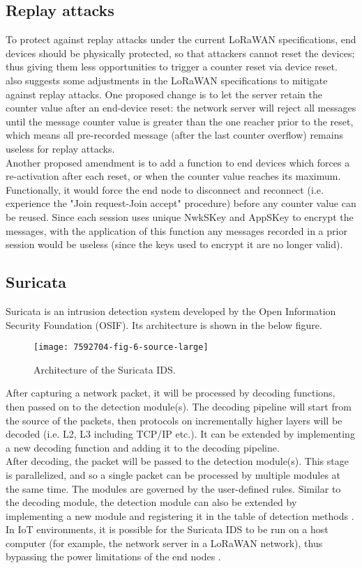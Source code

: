 \documentclass{article}
\begin{document}
\subsection{Replay attacks}
To protect against replay attacks under the current LoRaWAN specifications, end devices should be physically protected, so that attackers cannot reset the devices; thus giving them less opportunities to trigger a counter reset via device reset.\\
\cite{ref2} also suggests some adjustments in the LoRaWAN specifications to mitigate against replay attacks. One proposed change is to let the server retain the counter value after an end-device reset: the network server will reject all messages until the message counter value is greater than the one reacher prior to the reset, which means all pre-recorded message (after the last counter overflow) remains useless for replay attacks.\\
Another proposed amendment is to add a function to end devices which forces a re-activation after each reset, or when the counter value reaches its maximum. Functionally, it would force the end node to disconnect and reconnect (i.e. experience the "Join request-Join accept" procedure) before any counter value can be reused. Since each session uses unique NwkSKey and AppSKey to encrypt the messages, with the application of this function any messages recorded in a prior session would be useless (since the keys used to encrypt it are no longer valid).
\subsection{Suricata}
Suricata is an intrusion detection system developed by the Open Information Security Foundation (OSIF). Its architecture is shown in the below figure.
\begin{figure}[H]
\caption{Architecture of the Suricata IDS. \cite{7592704}}
\centerline{\texttt{[image: 7592704-fig-6-source-large]}}
\end{figure}
After capturing a network packet, it will be processed by decoding functions, then passed on to the detection module(s). The decoding pipeline will start from the source of the packets, then protocols on incrementally higher layers will be decoded (i.e. L2, L3 including TCP/IP etc.). It can be extended by implementing a new decoding function and adding it to the decoding pipeline.\\
After decoding, the packet will be passed to the detection module(s). This stage is parallelized, and so a single packet can be processed by multiple modules at the same time. The modules are governed by the user-defined rules. Similar to the decoding module, the detection module can also be extended by implementing a new module and registering it in the table of detection methods \cite{7592704}.\\
In IoT environments, it is possible for the Suricata IDS to be run on a host computer (for example, the network server in a LoRaWAN network), thus bypassing the power limitations of the end nodes \cite{Elrawy2018}.
\end{document}
